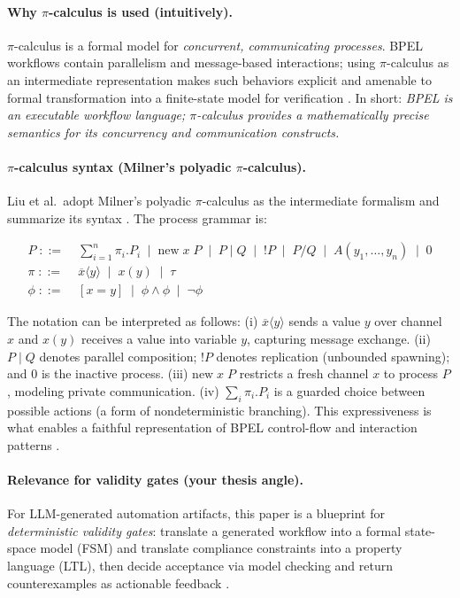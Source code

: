 \paragraph{Why $\pi$-calculus is used (intuitively).}
$\pi$-calculus is a formal model for \emph{concurrent, communicating processes}.
BPEL workflows contain parallelism and message-based interactions; using $\pi$-calculus as an intermediate representation
makes such behaviors explicit and amenable to formal transformation into a finite-state model for verification \cite{LMX07}.
In short: \emph{BPEL is an executable workflow language; $\pi$-calculus provides a mathematically precise semantics for its concurrency and communication constructs.}

\paragraph{$\pi$-calculus syntax (Milner’s polyadic $\pi$-calculus).}
Liu et al.\ adopt Milner’s polyadic $\pi$-calculus as the intermediate formalism and summarize its syntax \cite{LMX07}.
The process grammar is:

\begin{align}
P \;::=&\;\sum_{i=1}^{n} \pi_i . P_i 
\;\mid\; \mathrm{new}\;x\;P 
\;\mid\; P \mid Q 
\;\mid\; !P 
\;\mid\; P / Q
\;\mid\; A(y_1,\dots,y_n) 
\;\mid\; 0 \label{eq:lmx07-pi-proc}\\
\pi \;::=&\;\overline{x}\langle y\rangle \;\mid\; x(y) \;\mid\; \tau \label{eq:lmx07-pi-prefix}\\
\phi \;::=&\;[x = y] \;\mid\; \phi \wedge \phi \;\mid\; \neg \phi \label{eq:lmx07-pi-phi}
\end{align}

\noindent The notation can be interpreted as follows:
(i) $\overline{x}\langle y\rangle$ sends a value $y$ over channel $x$ and $x(y)$ receives a value into variable $y$,
capturing message exchange.
(ii) $P \mid Q$ denotes parallel composition; $!P$ denotes replication (unbounded spawning); and $0$ is the inactive process.
(iii) $\mathrm{new}\;x\;P$ restricts a fresh channel $x$ to process $P$, modeling private communication.
(iv) $\sum_i \pi_i.P_i$ is a guarded choice between possible actions (a form of nondeterministic branching).
This expressiveness is what enables a faithful representation of BPEL control-flow and interaction patterns \cite{LMX07}.

\paragraph{Relevance for validity gates (your thesis angle).}
For LLM-generated automation artifacts, this paper is a blueprint for \emph{deterministic validity gates}:
translate a generated workflow into a formal state-space model (FSM) and translate compliance constraints into a property language (LTL),
then decide acceptance via model checking and return counterexamples as actionable feedback \cite{LMX07}.

